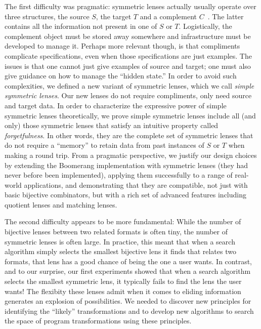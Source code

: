 \documentclass[acmsmall,screen,anonymous]{acmart}
\begin{document}
The first difficulty was pragmatic:  symmetric lenses actually
usually operate over three structures, the source $S$, the target $T$ and a
complement $C$~\cite{symmetric-lenses}.
The latter contains all the information not present in one of $S$ or $T$.  Logistically,
the complement object must be stored away somewhere and infrastructure must be developed
to manage it.  
Perhaps more relevant though, is that compliments complicate specifications, even when
those specifications are just examples.  The issues is that one cannot
just give examples of source and target; one must also give guidance on how to manage
the ``hidden state.''  In order to avoid such complexities, we defined a new
variant of symmetric lenses, which we call \emph{simple symmetric lenses}.  Our new
lenses do not require compliments, only need source and target data.
In order to characterize the expressive power of simple symmetric lenses
theoretically, we prove simple symmetric lenses
include all (and only) those symmetric lenses that satisfy
an intuitive property called \emph{forgetfulness}.  In other words, they are the
complete set of symmetric lenses that do not require a ``memory'' to retain data
from past instances of $S$ or $T$ when making a round trip.
From a pragmatic perspective, we justify our design choices by extending
the Boomerang implementation with symmetric lenses (they had never before been implemented),
applying them successfully to a range of real-world applications,
and demonstrating that they are compatible, not just with basic bijective combinators,
but with a rich set of advanced features including quotient lenses and matching lenses.

The second difficulty appears to be more fundamental:
While the number of bijective lenses
between two related formats is often tiny, the number of symmetric lenses is often
large.  In practice, this meant that when a search algorithm simply selects the smallest
bijective lens it finds that relates two formats, that lens has a good chance of being the
one a user wants.  In contrast, and to our surprise, our first experiments showed that
when a search algorithm selects the smallest symmetric lens, it typically fails
to find the lens the user wants!  The flexibity these lenses admit when it comes to
eliding information generates an explosion of possibilities.  We needed to discover
new principles for identifying the ``likely'' transformations and to
develop new algorithms to search
the space of program transformations using these principles.
\end{document}

